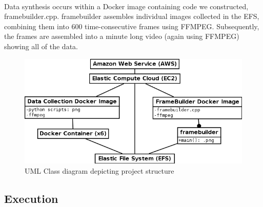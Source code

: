 \documentclass{article}
\begin{document}
  \paragraph{}
  Data synthesis occurs within a Docker image containing code we constructed, framebuilder.cpp. framebuilder assembles individual images collected in the EFS, combining them into 600 time-consecutive frames using FFMPEG. Subsequently, the frames are assembled into a minute long video (again using FFMPEG) showing all of the data.
  \begin{figure}[H]
    \centering
    \includegraphics[width=0.9\linewidth]{img/class_diagram.png}
    \caption{UML Class diagram depicting project structure}
    \label{class_diagram}
  \end{figure}

  \subsection{Execution}
\end{document}
